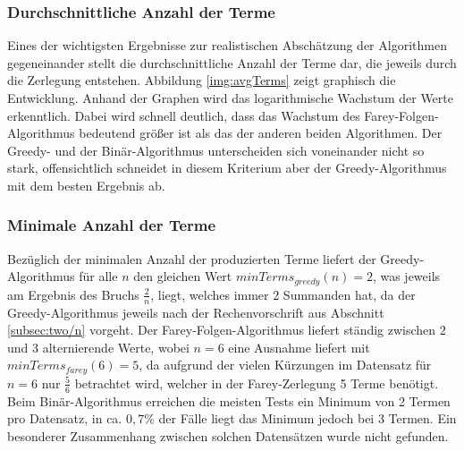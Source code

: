 \subsubsection{Durchschnittliche Anzahl der Terme}
Eines der wichtigsten Ergebnisse zur realistischen Abschätzung der Algorithmen gegeneinander stellt die durchschnittliche Anzahl der Terme dar, die jeweils durch die Zerlegung entstehen. Abbildung \ref{img:avgTerms} zeigt graphisch die Entwicklung.
Anhand der Graphen wird das logarithmische Wachstum der Werte erkenntlich. Dabei wird schnell deutlich, dass das Wachstum des Farey-Folgen-Algorithmus bedeutend größer ist als das der anderen beiden Algorithmen. Der Greedy- und der Binär-Algorithmus unterscheiden sich voneinander nicht so stark, offensichtlich schneidet in diesem Kriterium aber der Greedy-Algorithmus mit dem besten Ergebnis ab.

\subsubsection{Minimale Anzahl der Terme}
Bezüglich der minimalen Anzahl der produzierten Terme liefert der Greedy-Algorithmus für alle $n$ den gleichen Wert $minTerms_{greedy}(n) = 2$, was jeweils am Ergebnis des Bruchs $\frac{2}{n}$, liegt, welches immer 2 Summanden hat, da der Greedy-Algorithmus jeweils nach der Rechenvorschrift aus Abschnitt \ref{subsec:two/n} vorgeht. Der Farey-Folgen-Algorithmus liefert ständig zwischen $2$ und $3$ alternierende Werte, wobei $n=6$ eine Ausnahme liefert mit $minTerms_{farey}(6) = 5$, da aufgrund der vielen Kürzungen im Datensatz für $n=6$ nur $\frac{5}{6}$ betrachtet wird, welcher in der Farey-Zerlegung 5 Terme benötigt. Beim Binär-Algorithmus erreichen die meisten Tests ein Minimum von 2 Termen pro Datensatz, in ca. $0,7\%$ der Fälle liegt das Minimum jedoch bei 3 Termen. Ein besonderer Zusammenhang zwischen solchen Datensätzen wurde nicht gefunden.

